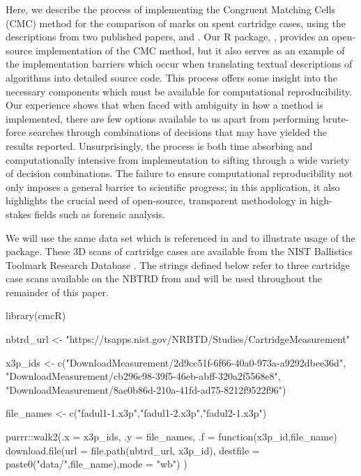 Here, we describe the process of implementing the Congruent Matching
Cells (CMC) method for the comparison of marks on spent cartridge cases,
using the descriptions from two published papers, \citet{song_3d_2014}
and \citet{tong_improved_2015}. Our R package, , provides
an open-source implementation of the CMC method, but it also serves as
an example of the implementation barriers which occur when translating
textual descriptions of algorithms into detailed source code. This
process offers some insight into the necessary components which must be
available for computational reproducibility. Our experience shows that
when faced with ambiguity in how a method is implemented, there are few
options available to us apart from performing brute-force searches
through combinations of decisions that may have yielded the results
reported. Unsurprisingly, the process is both time absorbing and
computationally intensive from implementation to sifting through a wide
variety of decision combinations. The failure to ensure computational
reproducibility not only imposes a general barrier to scientific
progress; in this application, it also highlights the crucial need of
open-source, transparent methodology in high-stakes fields such as
forensic analysis.

We will use the same data set which is referenced in
\citet{song_3d_2014} and \citet{tong_improved_2015} to illustrate usage
of the  package. These 3D scans of cartridge cases are
available from the NIST Ballistics Toolmark Research Database
\citep[NBTRD;][]{nbtrd}. The strings defined below refer to three
cartridge case scans available on the NBTRD from
\citet{fadul_empirical_2011} and will be used throughout the remainder
of this paper.

\begin{Schunk}
\begin{Sinput}
library(cmcR)

nbtrd_url <- "https://tsapps.nist.gov/NRBTD/Studies/CartridgeMeasurement"

x3p_ids <- c("DownloadMeasurement/2d9cc51f-6f66-40a0-973a-a9292dbee36d",
             "DownloadMeasurement/cb296c98-39f5-46eb-abff-320a2f5568e8",
             "DownloadMeasurement/8ae0b86d-210a-41fd-ad75-8212f9522f96")

file_names <- c("fadul1-1.x3p","fadul1-2.x3p","fadul2-1.x3p")

purrr::walk2(.x = x3p_ids,
             .y = file_names,
             .f = function(x3p_id,file_name){
               download.file(url = file.path(nbtrd_url, x3p_id), 
                             destfile = paste0("data/",file_name),mode = "wb")
             })
\end{Sinput}
\end{Schunk}

